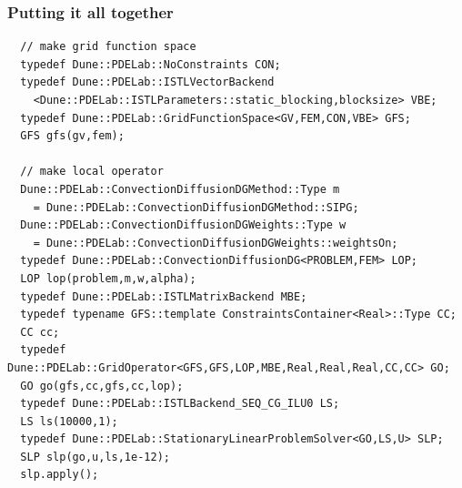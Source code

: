 \begin{frame}[fragile]
  \frametitle{Putting it all together}
  \scriptsize
  \begin{lstlisting}
  // make grid function space
  typedef Dune::PDELab::NoConstraints CON;
  typedef Dune::PDELab::ISTLVectorBackend
    <Dune::PDELab::ISTLParameters::static_blocking,blocksize> VBE;
  typedef Dune::PDELab::GridFunctionSpace<GV,FEM,CON,VBE> GFS;
  GFS gfs(gv,fem);

  // make local operator
  Dune::PDELab::ConvectionDiffusionDGMethod::Type m
    = Dune::PDELab::ConvectionDiffusionDGMethod::SIPG;
  Dune::PDELab::ConvectionDiffusionDGWeights::Type w
    = Dune::PDELab::ConvectionDiffusionDGWeights::weightsOn;
  typedef Dune::PDELab::ConvectionDiffusionDG<PROBLEM,FEM> LOP;
  LOP lop(problem,m,w,alpha);
  typedef Dune::PDELab::ISTLMatrixBackend MBE;
  typedef typename GFS::template ConstraintsContainer<Real>::Type CC;
  CC cc;
  typedef Dune::PDELab::GridOperator<GFS,GFS,LOP,MBE,Real,Real,Real,CC,CC> GO;
  GO go(gfs,cc,gfs,cc,lop);
  typedef Dune::PDELab::ISTLBackend_SEQ_CG_ILU0 LS;
  LS ls(10000,1);
  typedef Dune::PDELab::StationaryLinearProblemSolver<GO,LS,U> SLP;
  SLP slp(go,u,ls,1e-12);
  slp.apply();
  \end{lstlisting}
\end{frame}



